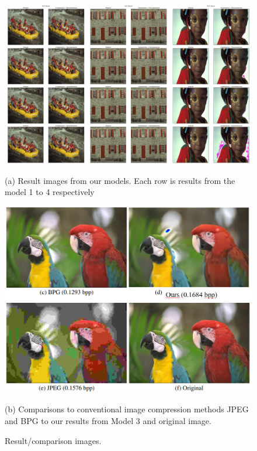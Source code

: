 \documentclass{article}
\begin{document}
\begin{figure}[h!]
\centering
\begin{minipage}[b]{.8\linewidth}
    \centering
    \includegraphics[width=\linewidth]{reconstruction.png}
    \centerline{(a)  Result images from our models. Each row is results from the model 1 to 4 respectively}\medskip

\end{minipage}
\begin{minipage}[b]{.5\linewidth}
    \centering
    \includegraphics[width=\linewidth]{comparison.png}
    \centerline{(b) Comparisons to conventional image compression methods JPEG and BPG to our results from Model 3 and original image.}\medskip
\end{minipage}
    \caption{Result/comparison images.}
    \label{fig:images}
\end{figure}
\end{document}
